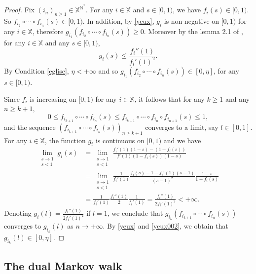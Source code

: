 \documentclass[12pt]{amsart}
\theoremstyle{definition}
\numberwithin{equation}{section}
\def\bb#1{\mathbb{#1}}
\def\geq{\geqslant}
\def\leq{\leqslant}
\begin{document}
\begin{proof}
Fix $( i_n )_{n \geq 1} \in \bb X^{\bb N^*}$. For any $i \in \bb X$ and $s \in [0,1)$, we have $f_i (s) \in [0,1)$. So $f_{i_2} \circ \cdots \circ f_{i_n} (s) \in [0,1)$. In addition, by \eqref{yeux}, $g_i$ is non-negative on $[0,1)$ for any $i \in \bb X$, therefore $g_{i_1} \left( f_{i_2} \circ \cdots \circ f_{i_n} (s) \right) \geq 0$. Moreover by the lemma 2.1 of \cite{geiger_survival_2001},
for any $i \in \bb X$ and any $s\in [0,1)$,
\begin{equation}
	\label{yeux002}
	g_i(s) \leq \frac{f_i''(1)}{f_i'(1)^2}.
\end{equation}
By Condition \ref{eglise}, $\eta < +\infty$ and so $g_{i_1} \left( f_{i_2} \circ \cdots \circ f_{i_n} (s) \right) \in [0,\eta]$, for any $s\in[0,1)$.

Since $f_i$ is increasing on $[0,1)$ for any $i \in \bb X$, it follows that for any $k \geq 1$ and any $n \geq k+1$,
\[
0 \leq f_{i_{k+1}} \circ \cdots \circ f_{i_n} (s) \leq f_{i_{k+1}} \circ \cdots \circ f_{i_n} \circ f_{i_{n+1}} (s) \leq 1,
\]
and the sequence $\left( f_{i_{k+1}} \circ \cdots \circ f_{i_n} (s) \right)_{n\geq k+1}$ converges to a limit, say $l \in [0,1]$. For any $i \in \bb X$, the function $g_i$ is continuous on $[0,1)$ and we have
\begin{align}
	\lim_{\substack{s\to 1\\s<1}} g_i(s) 
	&= \lim_{\substack{s\to 1\\s<1}} \frac{f_i'(1)(1-s) - \left( 1-f_i(s) \right)}{f'(1)\left( 1-f_i(s) \right)(1-s)} \nonumber\\
	&= \lim_{\substack{s\to 1\\s<1}} \frac{1}{f_i'(1)} \frac{f_i(s) - 1 - f_i'(1)(s-1)}{(s-1)^2} \frac{1-s}{ 1-f_i(s) } \nonumber\\
	&= \frac{1}{f_i'(1)} \frac{f_i''(1)}{2} \frac{1}{ f_i'(1) } = \frac{f_i''(1)}{2 f_i'(1)^2} <+\infty.
	\label{champ}
\end{align}
Denoting $g_i(l) = \frac{f_i''(1)}{2 f_i'(1)^2}$ if $l=1$, we conclude that $g_{i_k} \left( f_{i_{k+1}} \circ \cdots \circ f_{i_n} (s) \right)$ converges to $g_{i_k}(l)$ as $n \to +\infty$. By \eqref{yeux} and \eqref{yeux002}, we obtain that $g_{i_k}(l) \in [0,\eta]$.
\end{proof}


\subsection{The dual Markov walk}
\label{batailleBP}
\end{document}
